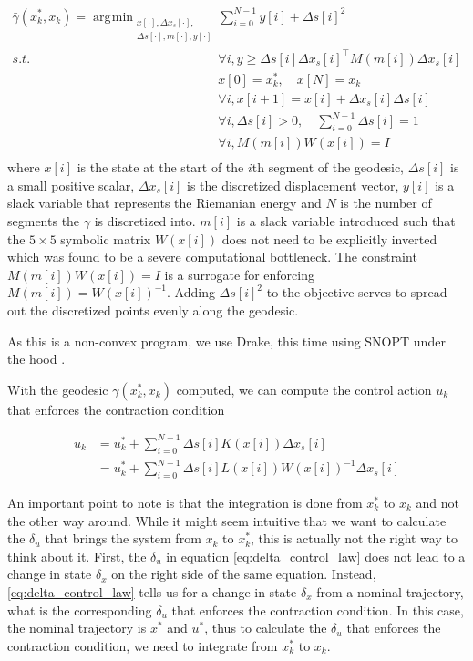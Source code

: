 \documentclass[journal]{IEEEtran}
\DeclareMathOperator*{\argmin}{\arg\!\min}
\begin{document}
\begin{equation}
	\label{eq:geodesic_opt}
	\begin{aligned}
		\bar{\gamma}(x^*_k, x_k) = \argmin_{ \substack{ x[\cdot], \Delta x_{s}[\cdot],\\ \Delta s[\cdot], m[\cdot], y[\cdot]}}
		& \sum_{i=0}^{N-1} y[i] + \Delta s[i]^2 \\
		s.t. & \forall i, y \geq \Delta s[i] \Delta x_s[i]^\top M(m[i]) \Delta x_s[i]\\
		& x[0] = x^*_k, \quad x[N] = x_k \\
		& \forall i, x[i+1] = x[i] + \Delta x_{s}[i]\Delta s[i] \\
		& \forall i, \Delta s[i] > 0, \quad \sum_{i=0}^{N-1} \Delta s[i] = 1\\
		& \forall i, M(m[i]) W(x[i]) = I  \\
	\end{aligned}
\end{equation}
where $x[i]$ is the state at the start of the $i$th segment of the geodesic, $\Delta s[i]$ is a small positive scalar, $\Delta x_s[i]$ is the discretized displacement vector, $y[i]$ is a slack variable that represents the Riemanian energy and $N$ is the number of segments the $\gamma$ is discretized into. $m[i]$ is a slack variable introduced such that the $5\times5$ symbolic matrix $W(x[i])$ does not need to be explicitly inverted which was found to be a severe computational bottleneck. The constraint $M(m[i]) W(x[i]) = I$ is a surrogate for enforcing $M(m[i])=W(x[i])^{-1}$. Adding $\Delta s[i]^2$ to the objective serves to spread out the discretized points evenly along the geodesic.

As this is a non-convex program, we use Drake, this time using SNOPT under the hood \autocite{DrakeModelBasedDesign}.

With the geodesic $\bar{\gamma}(x^*_k, x_k)$ computed, we can compute the control action $u_k$ that enforces the contraction condition

\begin{equation}
	\label{eq:control_law}
	\begin{aligned}
		u_k &= u^*_k + \sum_{i=0}^{N-1} \Delta s[i] K(x[i]) \Delta x_s[i]  \\
		&= u^*_k + \sum_{i=0}^{N-1} \Delta s[i] L(x[i]) W(x[i])^{-1} \Delta x_s[i]
	\end{aligned}
\end{equation}

An important point to note is that the integration is done from $x^*_k$ to $x_k$ and not the other way around. While it might seem intuitive that we want to calculate the $\delta_u$ that brings the system from $x_k$ to $x^*_k$, this is actually not the right way to think about it. First, the $\delta_u$ in equation \ref{eq:delta_control_law} does not lead to a change in state $\delta_x$ on the right side of the same equation. Instead, \ref{eq:delta_control_law} tells us for a change in state $\delta_x$ from a nominal trajectory, what is the corresponding $\delta_u$ that enforces the contraction condition. In this case, the nominal trajectory is $x^*$ and $u^*$, thus to calculate the $\delta_u$ that enforces the contraction condition, we need to integrate from $x^*_k$ to $x_k$.
\end{document}
